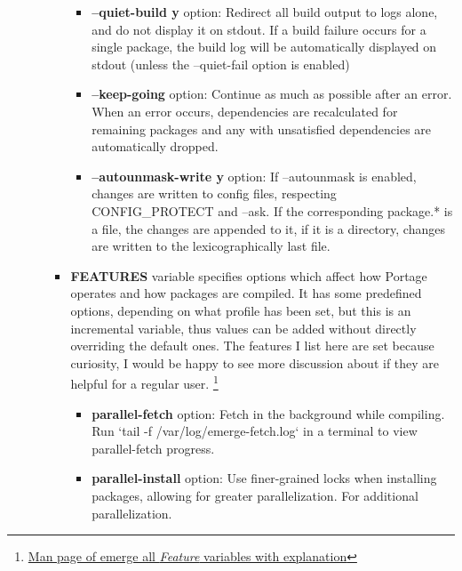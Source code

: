 \documentclass[10pt,a4paper]{article}
\begin{document}
\begin{enumerate}
\begin{enumerate}[label*=\arabic*.]
\begin{itemize}
\begin{itemize}[label={o}]
					\item \textbf{--quiet-build y} option: Redirect all build output to logs alone, and do not display it on stdout. If a build failure occurs for a single package, the build log will be automatically displayed on stdout (unless the --quiet-fail option is enabled)
					
					\item \textbf{--keep-going} option: Continue as much as possible after an error. When an error occurs, dependencies are recalculated for remaining packages and any with unsatisfied dependencies are automatically dropped.
					
					\item \textbf{--autounmask-write y} option: If --autounmask is enabled, changes are written to config files, respecting CONFIG\_PROTECT and --ask. If the corresponding package.* is a file, the changes are appended to it, if it is a directory, changes are written to the lexicographically last file.
					
				\end{itemize}
				
				\item \textbf{FEATURES} variable specifies options which affect how Portage operates and how packages are compiled. It has some predefined options, depending on what profile has been set, but this is an incremental variable, thus values can be added without directly overriding the default ones. The features I list here are set because curiosity, I would be happy to see more discussion about if they are helpful for a regular user. \footnote{ \href{https://dev.gentoo.org/~zmedico/portage/doc/man/make.conf.5.html}{Man page of emerge all \textit{Feature} variables with explanation}}

				

				\begin{itemize}[label={o}]
					
					\item \textbf{parallel-fetch} option: Fetch in the background while compiling. Run `tail -f /var/log/emerge-fetch.log` in a terminal to view parallel-fetch progress.
					
					\item \textbf{parallel-install} option: Use finer-grained locks when installing packages, allowing for greater parallelization. For additional parallelization.
					

\end{itemize}
\end{itemize}
\end{enumerate}
\end{enumerate}
\end{document}
